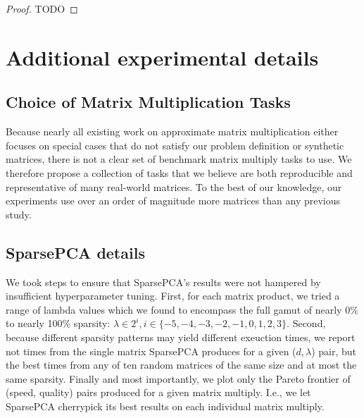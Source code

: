 \begin{proof}
TODO
\end{proof}


\vfill\break  %
\section{Additional experimental details} \label{sec:experimentDetails}

\subsection{Choice of Matrix Multiplication Tasks}

Because nearly all existing work on approximate matrix multiplication either focuses on special cases that do not satisfy our problem definition \cite{quickerAdc, pq, opq} or synthetic matrices, there is not a clear set of benchmark matrix multiply tasks to use. We therefore propose a collection of tasks that we believe are both reproducible and representative of many real-world matrices. To the best of our knowledge, our experiments use over an order of magnitude more matrices than any previous study.


\subsection{SparsePCA details}

We took steps to ensure that SparsePCA's results were not hampered by insufficient hyperparameter tuning. First, for each matrix product, we tried a range of lambda values which we found to encompass the full gamut of nearly 0\% to nearly 100\% sparsity: $\lambda \in 2^i, i \in \{-5, -4, -3, -2, -1, 0, 1, 2, 3\}$. Second, because different sparsity patterns may yield different exeuction times, we report not times from the single matrix SparsePCA produces for a given ($d, \lambda$) pair, but the best times from any of ten random matrices of the same size and at most the same sparsity. Finally and most importantly, we plot only the Pareto frontier of (speed, quality) pairs produced for a given matrix multiply. I.e., we let SparsePCA cherrypick its best results on each individual matrix multiply.


